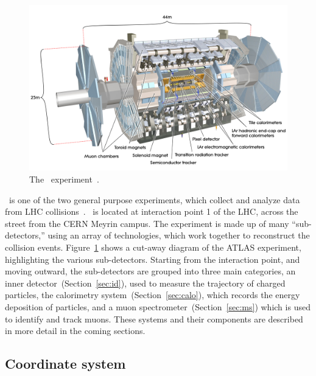 \begin{figure}[ht]
  \centering
  \includegraphics[width=\textwidth, clip=true, trim=0 0 0 0]
    {figs/lhc/atlas_det.jpg}
  \caption{
    The \atlas\ experiment~\cite{Pequenao:1095924}.
  }
  \label{fig:atlas_det}
\end{figure}

\atlas\ is one of the two general purpose experiments, which
collect and analyze data from LHC collisions~\cite{cern-jinst-atlas}.
\atlas\ is located at interaction point 1 of the LHC, across the street from
the CERN Meyrin campus.
The experiment is made up of many ``sub-detectors,'' using an array of
technologies, which work together to reconstruct the collision events.
Figure~\ref{fig:atlas_det} shows a cut-away diagram of the ATLAS experiment,
highlighting the various sub-detectors.
Starting from the interaction point, and moving outward, the sub-detectors
are grouped into three main categories, an inner
detector~(Section~\ref{sec:id}), used to measure the trajectory of charged
particles, the calorimetry system~(Section~\ref{sec:calo}), which records the
energy deposition of particles, and a muon spectrometer~(Section~\ref{sec:ms})
which is used to identify and track muons.
These systems and their components are described in more detail in the coming
sections.

\subsection{Coordinate system} 
\label{sec:coordinate_system}

